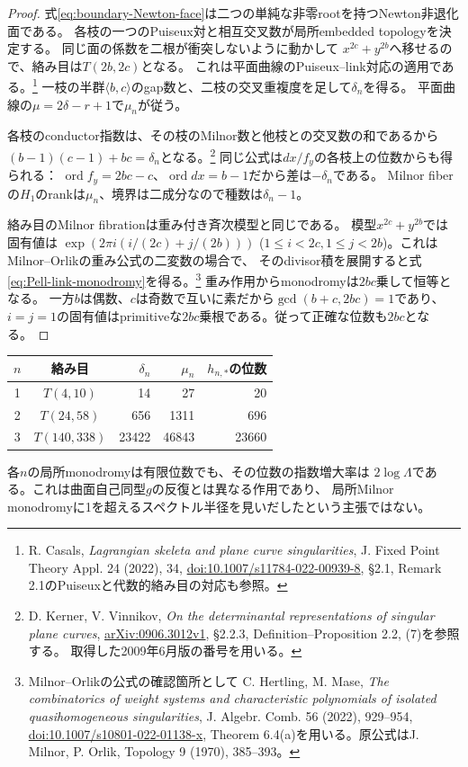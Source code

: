 \begin{proof}
式\eqref{eq:boundary-Newton-face}は二つの単純な非零rootを持つNewton非退化面である。
各枝の一つのPuiseux対と相互交叉数が局所embedded topologyを決定する。
同じ面の係数を二根が衝突しないように動かして
$x^{2c}+y^{2b}$へ移せるので、絡み目は$T(2b,2c)$となる。
これは平面曲線のPuiseux--link対応の適用である。\footnote{
R. Casals, \emph{Lagrangian skeleta and plane curve singularities},
J. Fixed Point Theory Appl. 24 (2022), 34,
\href{https://doi.org/10.1007/s11784-022-00939-8}{doi:10.1007/s11784-022-00939-8},
\S2.1, Remark 2.1のPuiseuxと代数的絡み目の対応も参照。}
一枝の半群$\langle b,c\rangle$のgap数と、二枝の交叉重複度を足して$\delta_n$を得る。
平面曲線の$\mu=2\delta-r+1$で$\mu_n$が従う。

各枝のconductor指数は、その枝のMilnor数と他枝との交叉数の和であるから
$(b-1)(c-1)+bc=\delta_n$となる。\footnote{
D. Kerner, V. Vinnikov,
\emph{On the determinantal representations of singular plane curves},
\href{https://arxiv.org/abs/0906.3012v1}{arXiv:0906.3012v1},
\S2.2.3, Definition--Proposition 2.2, (7)を参照する。
取得した2009年6月版の番号を用いる。}
同じ公式は$dx/f_y$の各枝上の位数からも得られる：
$\operatorname{ord}f_y=2bc-c$、$\operatorname{ord}dx=b-1$だから差は$-\delta_n$である。
Milnor fiberの$H_1$のrankは$\mu_n$、境界は二成分なので種数は$\delta_n-1$。

絡み目のMilnor fibrationは重み付き斉次模型と同じである。
模型$x^{2c}+y^{2b}$では固有値は
$\exp(2\pi i(i/(2c)+j/(2b)))$
($1\le i<2c,1\le j<2b$)。これはMilnor--Orlikの重み公式の二変数の場合で、
そのdivisor積を展開すると式\eqref{eq:Pell-link-monodromy}を得る。\footnote{
Milnor--Orlikの公式の確認箇所として
C. Hertling, M. Mase,
\emph{The combinatorics of weight systems and characteristic polynomials of isolated quasihomogeneous singularities},
J. Algebr. Comb. 56 (2022), 929--954,
\href{https://doi.org/10.1007/s10801-022-01138-x}{doi:10.1007/s10801-022-01138-x},
Theorem 6.4(a)を用いる。原公式はJ. Milnor, P. Orlik, Topology 9 (1970), 385--393。}
重み作用からmonodromyは$2bc$乗して恒等となる。
一方$b$は偶数、$c$は奇数で互いに素だから$\gcd(b+c,2bc)=1$であり、
$i=j=1$の固有値はprimitiveな$2bc$乗根である。従って正確な位数も$2bc$となる。
\end{proof}

\begin{center}
\begin{tabular}{c|c|r|r|r}
$n$&絡み目&$\delta_n$&$\mu_n$&$h_{n,*}$の位数\\\hline
1&$T(4,10)$&14&27&20\\
2&$T(24,58)$&656&1311&696\\
3&$T(140,338)$&23422&46843&23660
\end{tabular}
\end{center}
各$n$の局所monodromyは有限位数でも、その位数の指数増大率は
$2\log\Lambda$である。これは曲面自己同型$g$の反復とは異なる作用であり、
局所Milnor monodromyに1を超えるスペクトル半径を見いだしたという主張ではない。

